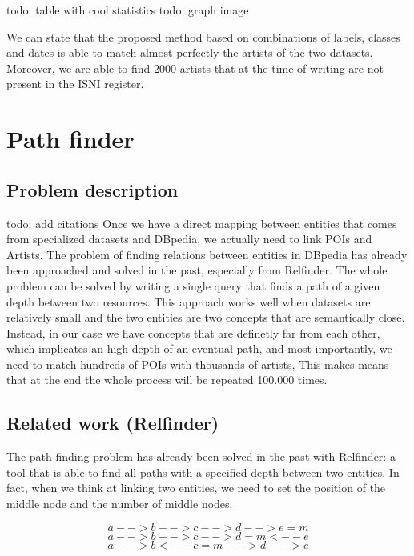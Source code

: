 todo: table with cool statistics
todo: graph image

We can state that the proposed method based on combinations of labels, classes and dates is able to match almost perfectly the artists of the two datasets. Moreover, we are able to find 2000 artists that at the time of writing are not present in the ISNI register.

\section{Path finder}
\subsection{Problem description}
todo: add citations
Once we have a direct mapping between entities that comes from specialized datasets and DBpedia, we actually need to link POIs and Artists.
The problem of finding relations between entities in DBpedia has already been approached and solved in the past, especially from Relfinder. The whole problem can be solved by writing a single query that finds a path of a given depth between two resources. This approach works well when datasets are relatively small and the two entities are two concepts that are semantically close. Instead, in our case we have concepts that are definetly far from each other, which implicates an high depth of an eventual path, and most importantly, we need to match hundreds of POIs with thousands of artists, This makes means that at the end the whole process will be repeated 100.000 times.
\subsection{Related work (Relfinder)}
The path finding problem has already been solved in the past with Relfinder: a tool that is able to find all paths with a specified depth between two entities. 
In fact, when we think at linking two entities, we need to set the position of the middle node and the number of middle nodes.

$$a-->b-->c-->d-->e=m$$
$$a-->b-->c-->d=m<--e$$
$$a-->b<--c=m-->d-->e$$

